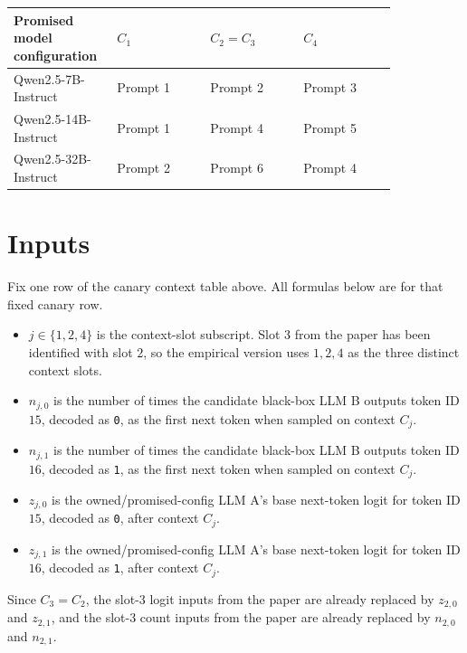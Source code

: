 \documentclass[11pt]{article}
\begin{document}
\begin{center}
\begin{tabular}{|>{\raggedright\arraybackslash}p{0.18\linewidth}|>{\raggedright\arraybackslash}p{0.22\linewidth}|>{\raggedright\arraybackslash}p{0.22\linewidth}|>{\raggedright\arraybackslash}p{0.22\linewidth}|}
\hline
Promised model configuration & \(C_1\) & \(C_2=C_3\) & \(C_4\) \\
\hline
Qwen2.5-7B-Instruct & Prompt 1 & Prompt 2 & Prompt 3 \\
\hline
Qwen2.5-14B-Instruct & Prompt 1 & Prompt 4 & Prompt 5 \\
\hline
Qwen2.5-32B-Instruct & Prompt 2 & Prompt 6 & Prompt 4 \\
\hline
\end{tabular}
\end{center}

\section{Inputs}

Fix one row of the canary context table above. All formulas below are for that fixed canary row.

\begin{itemize}[leftmargin=*]
    \item \(j \in \{1,2,4\}\) is the context-slot subscript. Slot \(3\) from the paper has been identified with slot \(2\), so the empirical version uses \(1,2,4\) as the three distinct context slots.
    \item \(n_{j,0}\) is the number of times the candidate black-box LLM B outputs token ID \(15\), decoded as \texttt{0}, as the first next token when sampled on context \(C_j\).
    \item \(n_{j,1}\) is the number of times the candidate black-box LLM B outputs token ID \(16\), decoded as \texttt{1}, as the first next token when sampled on context \(C_j\).
    \item \(z_{j,0}\) is the owned/promised-config LLM A's base next-token logit for token ID \(15\), decoded as \texttt{0}, after context \(C_j\).
    \item \(z_{j,1}\) is the owned/promised-config LLM A's base next-token logit for token ID \(16\), decoded as \texttt{1}, after context \(C_j\).
\end{itemize}

Since \(C_3=C_2\), the slot-3 logit inputs from the paper are already replaced by \(z_{2,0}\) and \(z_{2,1}\), and the slot-3 count inputs from the paper are already replaced by \(n_{2,0}\) and \(n_{2,1}\).
\end{document}
